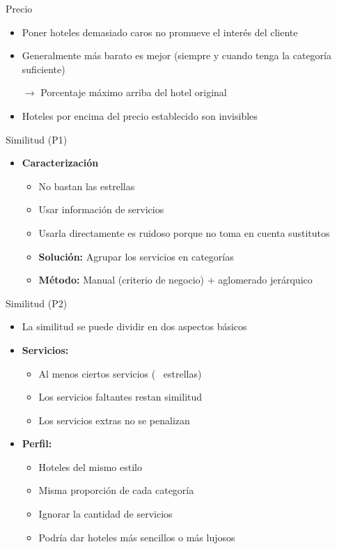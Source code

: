 \documentclass{beamer}
\begin{document}
\begin{frame}{Precio}
	\begin{itemize}%
		\item Poner hoteles demasiado caros no promueve el interés del cliente
		\item Generalmente más barato es mejor (siempre y cuando tenga la categoría suficiente)
		\item[$\mathbf{\rightarrow}$] Porcentaje máximo arriba del hotel original
		\item Hoteles por encima del precio establecido son invisibles
	\end{itemize}
\end{frame}

\begin{frame}{Similitud (P1)}
	\begin{itemize}%
		\item \textbf{Caracterización}
		\begin{itemize}
			\item No bastan las estrellas
			\item Usar información de servicios
			\item Usarla directamente es ruidoso porque no toma en cuenta sustitutos
			\item \textbf{Solución:} Agrupar los servicios en categorías
			\item \textbf{Método:} Manual (criterio de negocio) + aglomerado jerárquico
		\end{itemize}
	\end{itemize}
\end{frame}

\begin{frame}{Similitud (P2)}
	\begin{itemize}%
		\item La similitud se puede dividir en dos aspectos básicos
		\item \textbf{Servicios:}
		\begin{itemize}
			\item Al menos ciertos servicios (~ estrellas)
			\item Los servicios faltantes restan similitud
			\item Los servicios extras no se penalizan
		\end{itemize}
		\item \textbf{Perfil:}
		\begin{itemize}
			\item Hoteles del mismo estilo
			\item Misma proporción de cada categoría
			\item Ignorar la cantidad de servicios
			\item Podría dar hoteles más sencillos o más lujosos
		\end{itemize}
	\end{itemize}
\end{frame}
\end{document}
